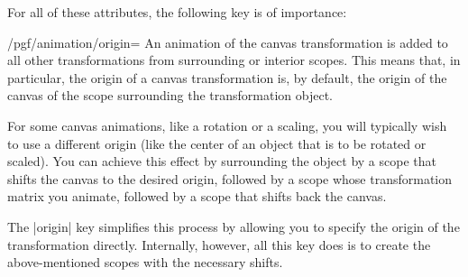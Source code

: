 For all of these attributes, the following key is of importance:
%
\begin{key}{/pgf/animation/origin=}
    An animation of the canvas transformation is added to all other
    transformations from surrounding or interior scopes. This means that, in
    particular, the origin of a canvas transformation is, by default, the
    origin of the canvas of the scope surrounding the transformation object.

    For some canvas animations, like a rotation or a scaling, you will
    typically wish to use a different origin (like the center of an object that
    is to be rotated or scaled). You can achieve this effect by surrounding the
    object by a scope that shifts the canvas to the desired origin, followed by
    a scope whose transformation matrix you animate, followed by a scope that
    shifts back the canvas.

    The |origin| key simplifies this process by allowing you to specify the
    origin of the transformation directly. Internally, however, all this key
    does is to create the above-mentioned scopes with the necessary shifts.
\begin{codeexample}[
    preamble={\usepgfmodule{animations}},
    animation list={0.5,1,1.5,2},
]
\end{codeexample}
\end{key}

